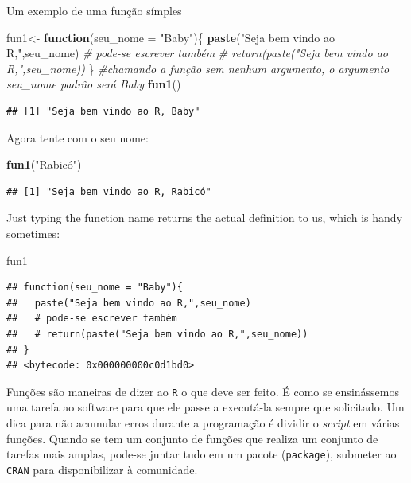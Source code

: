 \documentclass[
]{book}
\newenvironment{Shaded}{\begin{snugshade}}{\end{snugshade}}
\newcommand{\CommentTok}[1]{\textcolor[rgb]{0.56,0.35,0.01}{\textit{#1}}}
\newcommand{\ControlFlowTok}[1]{\textcolor[rgb]{0.13,0.29,0.53}{\textbf{#1}}}
\newcommand{\DataTypeTok}[1]{\textcolor[rgb]{0.13,0.29,0.53}{#1}}
\newcommand{\KeywordTok}[1]{\textcolor[rgb]{0.13,0.29,0.53}{\textbf{#1}}}
\newcommand{\NormalTok}[1]{#1}
\newcommand{\StringTok}[1]{\textcolor[rgb]{0.31,0.60,0.02}{#1}}
\theoremstyle{definition}
\theoremstyle{definition}
\theoremstyle{definition}
\theoremstyle{remark}
\begin{document}
Um exemplo de uma função símples

\begin{Shaded}
\begin{Highlighting}[]
\NormalTok{ fun1<-}\StringTok{ }\ControlFlowTok{function}\NormalTok{(}\DataTypeTok{seu_nome =} \StringTok{"Baby"}\NormalTok{)\{}
  \KeywordTok{paste}\NormalTok{(}\StringTok{"Seja bem vindo ao R,"}\NormalTok{,seu_nome)}
  \CommentTok{# pode-se escrever também}
  \CommentTok{# return(paste("Seja bem vindo ao R,",seu_nome))}
\NormalTok{\}}
\CommentTok{#chamando a função sem nenhum argumento, o argumento seu_nome padrão será Baby}
\KeywordTok{fun1}\NormalTok{()}
\end{Highlighting}
\end{Shaded}

\begin{verbatim}
## [1] "Seja bem vindo ao R, Baby"
\end{verbatim}

Agora tente com o seu nome:

\begin{Shaded}
\begin{Highlighting}[]
\KeywordTok{fun1}\NormalTok{(}\StringTok{"Rabicó")}
\end{Highlighting}
\end{Shaded}

\begin{verbatim}
## [1] "Seja bem vindo ao R, Rabicó"
\end{verbatim}

Just typing the function name returns the actual definition to us, which is handy sometimes:

\begin{Shaded}
\begin{Highlighting}[]
\NormalTok{fun1}
\end{Highlighting}
\end{Shaded}

\begin{verbatim}
## function(seu_nome = "Baby"){
##   paste("Seja bem vindo ao R,",seu_nome)
##   # pode-se escrever também
##   # return(paste("Seja bem vindo ao R,",seu_nome))
## }
## <bytecode: 0x000000000c0d1bd0>
\end{verbatim}

Funções são maneiras de dizer ao \texttt{R} o que deve ser feito. É como se ensinássemos uma tarefa ao software para que ele passe a executá-la sempre que solicitado. Um dica para não acumular erros durante a programação é dividir o \emph{script} em várias funções. Quando se tem um conjunto de funções que realiza um conjunto de tarefas mais amplas, pode-se juntar tudo em um pacote (\texttt{package}), submeter ao \texttt{CRAN} para disponibilizar à comunidade.
\end{document}
